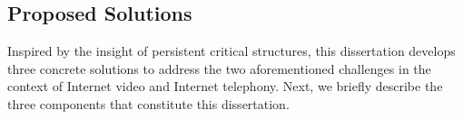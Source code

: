 


\subsection{Proposed Solutions}
Inspired by the insight of persistent critical structures, this dissertation develops 
three concrete solutions
to address the two aforementioned challenges in the context
of Internet video and Internet telephony. 
Next, we briefly describe the three components that constitute 
this dissertation.



